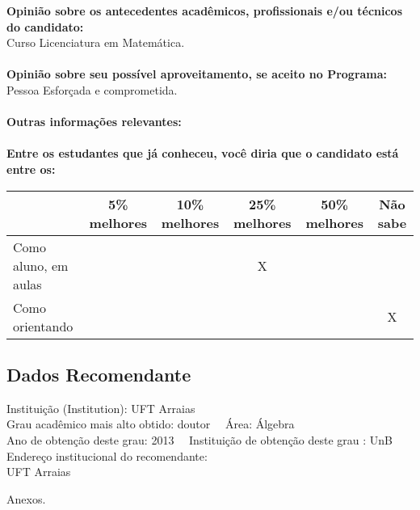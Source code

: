 \documentclass[11pt]{article}
\begin{document}
\textbf{Opinião sobre os antecedentes acadêmicos, profissionais e/ou técnicos do candidato:}
\\Curso Licenciatura em Matemática.\\
\\
\textbf{Opinião sobre seu possível aproveitamento, se aceito no Programa:}
\\Pessoa Esforçada e comprometida.\\ 
\\
\textbf{Outras informações relevantes:} \\
\\[0.3cm]
\textbf{Entre os estudantes que já conheceu, você diria que o candidato está entre os:}
\\
\begin{tabular}{|l|c|c|c|c|c|}
\hline
 & 5\% melhores & 10\% melhores & 25\% melhores & 50\% melhores & Não sabe \\
\hline
Como aluno, em aulas &  &  & X &  & \\
\hline
Como orientando &  &  &  &  & X\\
\hline
\end{tabular}
\subsection*{Dados Recomendante} 
	Instituição (Institution): UFT Arraias
\\ 
	Grau acadêmico mais alto obtido: doutor
	\ \ Área: Álgebra
	\\
	Ano de obtenção deste grau: 2013
	\ \ 
	Instituição de obtenção deste grau : UnB
	\\ 
	Endereço institucional do recomendante: \\ UFT Arraias 
\begin{center}
Anexos.
\end{center}
\end{document}
